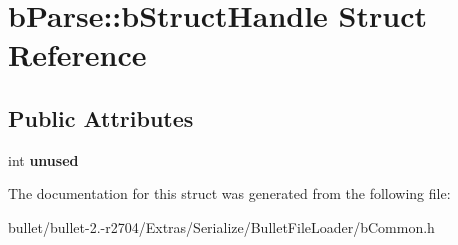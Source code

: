 \hypertarget{structb_parse_1_1b_struct_handle}{\section{b\+Parse\+:\+:b\+Struct\+Handle Struct Reference}
\label{structb_parse_1_1b_struct_handle}
}
\subsection*{Public Attributes}
\begin{DoxyCompactItemize}
\item 
\hypertarget{structb_parse_1_1b_struct_handle_af4cacb8f0c2c92b1a698b2f169d0ebd8}{int {\bfseries unused}}\label{structb_parse_1_1b_struct_handle_af4cacb8f0c2c92b1a698b2f169d0ebd8}

\end{DoxyCompactItemize}


The documentation for this struct was generated from the following file\+:\begin{DoxyCompactItemize}
\item 
bullet/bullet-\/2.-\/r2704/\+Extras/\+Serialize/\+Bullet\+File\+Loader/b\+Common.\+h\end{DoxyCompactItemize}
